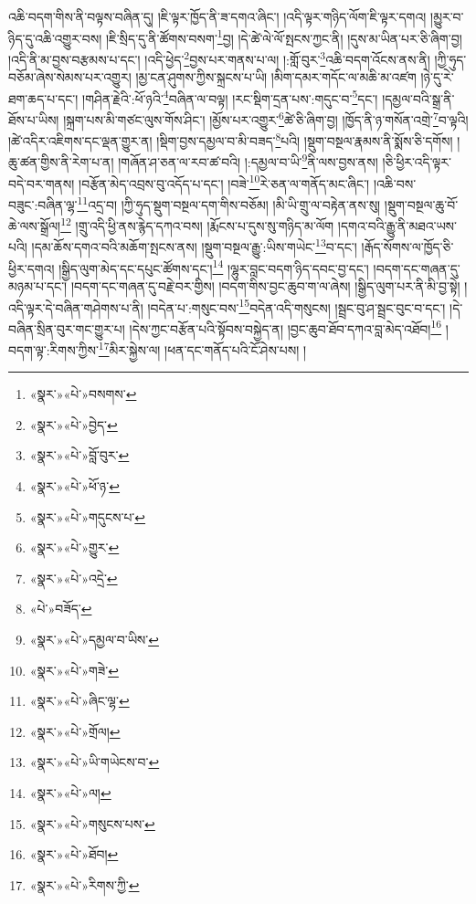 འཆི་བདག་གིས་ནི་བལྟས་བཞིན་དུ། །ཇི་ལྟར་ཁྱོད་ནི་ཟ་དགའ་ཞིང་། །འདི་ལྟར་གཉིད་ལོག་ཇི་ལྟར་དགའ། །མྱུར་བ་ཉིད་དུ་འཆི་འགྱུར་བས། །ཇི་སྲིད་དུ་ནི་ཚོགས་བསག་\footnote{«སྣར་»«པེ་»བསགས་}བྱ། །དེ་ཚེ་ལེ་ལོ་སྤངས་ཀྱང་ནི། །དུས་མ་ཡིན་པར་ཅི་ཞིག་བྱ། །འདི་ནི་མ་བྱས་བརྩམས་པ་དང་། །འདི་ཕྱེད་\footnote{«སྣར་»«པེ་»བྱེད་}བྱས་པར་གནས་པ་ལ། །:གློ་བུར་\footnote{«སྣར་»«པེ་»བློ་བུར་}འཆི་བདག་འོངས་ནས་ནི། །ཀྱི་ཧུད་བཅོམ་ཞེས་སེམས་པར་འགྱུར། །མྱ་ངན་ཤུགས་ཀྱིས་སྐྲངས་པ་ཡི། །མིག་དམར་གདོང་ལ་མཆི་མ་འཛག །ཉེ་དུ་རེ་ཐག་ཆད་པ་དང་། །གཤིན་རྗེའི་:ཕོ་ཉའི་\footnote{«སྣར་»«པེ་»ཕོ་ཉ་}བཞིན་ལ་བལྟ། །རང་སྡིག་དྲན་པས་:གདུང་བ་\footnote{«སྣར་»«པེ་»གདུངས་པ་}དང་། །དམྱལ་བའི་སྒྲ་ནི་ཐོས་པ་ཡིས། །སྐྲག་པས་མི་གཙང་ལུས་གོས་ཤིང་། །མྱོས་པར་འགྱུར་\footnote{«སྣར་»«པེ་»གྱུར་}ཚེ་ཅི་ཞིག་བྱ། །ཁྱོད་ནི་ཉ་གསོན་འགྲེ་\footnote{«སྣར་»«པེ་»འདྲེ་}བ་ལྟའི། །ཚེ་འདིར་འཇིགས་དང་ལྡན་གྱུར་ན། །སྡིག་བྱས་དམྱལ་བ་མི་བཟད་\footnote{«པེ་»བཟོད་}པའི། །སྡུག་བསྔལ་རྣམས་ནི་སྨོས་ཅི་དགོས། །ཆུ་ཚན་གྱིས་ནི་རེག་པ་ན། །གཞོན་ཤ་ཅན་ལ་རབ་ཚ་བའི། །:དམྱལ་བ་ཡི་\footnote{«སྣར་»«པེ་»དམྱལ་བ་ཡིས་}ནི་ལས་བྱས་ནས། །ཅི་ཕྱིར་འདི་ལྟར་བདེ་བར་གནས། །བརྩོན་མེད་འབྲས་བུ་འདོད་པ་དང་། །བཟེ་\footnote{«སྣར་»«པེ་»གཟེ་}རེ་ཅན་ལ་གནོད་མང་ཞིང་། །འཆི་བས་བཟུང་:བཞིན་ལྷ་\footnote{«སྣར་»«པེ་»ཞིང་ལྷ་}འདྲ་བ། །ཀྱི་ཧུད་སྡུག་བསྔལ་དག་གིས་བཅོམ། །མི་ཡི་གྲུ་ལ་བརྟེན་ནས་སུ། །སྡུག་བསྔལ་ཆུ་བོ་ཆེ་ལས་སྒྲོལ།\footnote{«སྣར་»«པེ་»གྲོལ།} །གྲུ་འདི་ཕྱི་ནས་རྙེད་དཀའ་བས། །རྨོངས་པ་དུས་སུ་གཉིད་མ་ལོག །དགའ་བའི་རྒྱུ་ནི་མཐའ་ཡས་པའི། །དམ་ཆོས་དགའ་བའི་མཆོག་སྤངས་ནས། །སྡུག་བསྔལ་རྒྱུ་:ཡིས་གཡེང་\footnote{«སྣར་»«པེ་»ཡི་གཡེངས་བ་}བ་དང་། །རྒོད་སོགས་ལ་ཁྱོད་ཅི་ཕྱིར་དགའ། །སྒྱིད་ལུག་མེད་དང་དཔུང་ཚོགས་དང་།\footnote{«སྣར་»«པེ་»ལ།} །ལྷུར་བླང་བདག་ཉིད་དབང་བྱ་དང་། །བདག་དང་གཞན་དུ་མཉམ་པ་དང་། །བདག་དང་གཞན་དུ་བརྗེ་བར་གྱིས། །བདག་གིས་བྱང་ཆུབ་ག་ལ་ཞེས། །སྒྱིད་ལུག་པར་ནི་མི་བྱ་སྟེ། །འདི་ལྟར་དེ་བཞིན་གཤེགས་པ་ནི། །བདེན་པ་:གསུང་བས་\footnote{«སྣར་»«པེ་»གསུངས་པས་}བདེན་འདི་གསུངས། །སྦྲང་བུ་ཤ་སྦྲང་བུང་བ་དང་། །དེ་བཞིན་སྲིན་བུར་གང་གྱུར་པ། །དེས་ཀྱང་བརྩོན་པའི་སྟོབས་བསྐྱེད་ན། །བྱང་ཆུབ་ཐོབ་དཀའ་བླ་མེད་འཐོབ།\footnote{«སྣར་»«པེ་»ཐོབ།} །བདག་ལྟ་:རིགས་ཀྱིས་\footnote{«སྣར་»«པེ་»རིགས་ཀྱི་}མིར་སྐྱེས་ལ། །ཕན་དང་གནོད་པའི་ངོ་ཤེས་པས། །
